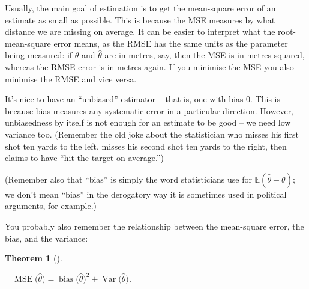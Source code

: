 \documentclass[
  letterpaper,
  DIV=11,
  numbers=noendperiod]{scrreprt}
\theoremstyle{plain}
\newtheorem{theorem}{Theorem}[chapter]
\theoremstyle{definition}
\theoremstyle{definition}
\theoremstyle{remark}
\begin{document}
Usually, the main goal of estimation is to get the mean-square error of
an estimate as small as possible. This is because the MSE measures by
what distance we are missing on average. It can be easier to interpret
what the root-mean-square error means, as the RMSE has the same units as
the parameter being measured: if \(\theta\) and \(\widehat{\theta}\) are
in metres, say, then the MSE is in metres-squared, whereas the RMSE
error is in metres again. If you minimise the MSE you also minimise the
RMSE and vice versa.

It's nice to have an ``unbiased'' estimator -- that is, one with bias 0.
This is because bias measures any systematic error in a particular
direction. However, unbiasedness by itself is not enough for an estimate
to be good -- we need low variance too. (Remember the old joke about the
statistician who misses his first shot ten yards to the left, misses his
second shot ten yards to the right, then claims to have ``hit the target
on average.'')

(Remember also that ``bias'' is simply the word statisticians use for
\(\mathbb E(\widehat\theta - \theta)\); we don't mean ``bias'' in the
derogatory way it is sometimes used in political arguments, for
example.)

You probably also remember the relationship between the mean-square
error, the bias, and the variance:

\begin{theorem}[]\protect\hypertarget{thm-MSE-bias}{}\label{thm-MSE-bias}

~
\(\operatorname{MSE}\big(\widehat\theta\big) = \operatorname{bias}\big(\widehat\theta\big)^2 + \operatorname{Var}\big(\widehat\theta\big)\).

\end{theorem}
\end{document}
